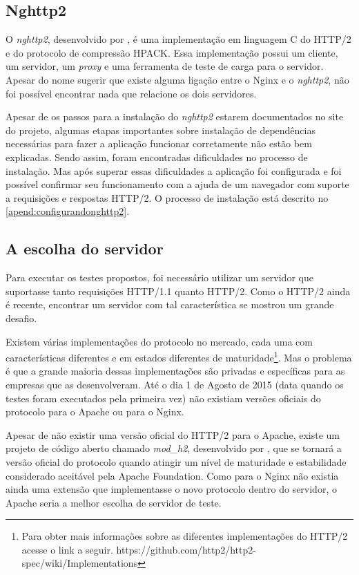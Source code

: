 \subsection{Nghttp2}
\label{nghttp2}

O \textit{nghttp2}, desenvolvido por , é uma implementação em linguagem C do HTTP/2 e do protocolo de compressão HPACK. Essa implementação possui um cliente, um servidor, um \textit{proxy} e uma ferramenta de teste de carga para o servidor. Apesar do nome sugerir que existe alguma ligação entre o Nginx e o \textit{nghttp2}, não foi possível encontrar nada que relacione os dois servidores.

Apesar de os passos para a instalação do \textit{nghttp2} estarem documentados no site do projeto, algumas etapas importantes sobre instalação de dependências necessárias para fazer a aplicação funcionar corretamente não estão bem explicadas. Sendo assim, foram encontradas dificuldades no processo de instalação. Mas após superar essas dificuldades a aplicação foi configurada e foi possível confirmar seu funcionamento com a ajuda de um navegador com suporte a requisições e respostas HTTP/2. O processo de instalação está descrito no \autoref{apend:configurandonghttp2}.

\subsection{A escolha do servidor}
\label{aescolhadoservidor}

Para executar os testes propostos, foi necessário utilizar um servidor que suportasse tanto requisições HTTP/1.1 quanto HTTP/2. Como o HTTP/2 ainda é recente, encontrar um servidor com tal característica se mostrou um grande desafio.

Existem várias implementações do protocolo no mercado, cada uma com características diferentes e em estados diferentes de maturidade\footnote{Para obter mais informações sobre as diferentes implementações do HTTP/2 acesse o link a seguir. https://github.com/http2/http2-spec/wiki/Implementations}. Mas o problema é que a grande maioria dessas implementações são privadas e específicas para as empresas que as desenvolveram. Até o dia 1 de Agosto de 2015 (data quando os testes foram executados pela primeira vez) não existiam versões oficiais do protocolo para o Apache ou para o Nginx.

Apesar de não existir uma versão oficial do HTTP/2 para o Apache, existe um projeto de código aberto chamado \textit{mod\_h2}, desenvolvido por , que se tornará a versão oficial do protocolo quando atingir um nível de maturidade e estabilidade considerado aceitável pela Apache Foundation. Como para o Nginx não existia ainda uma extensão que implementasse o novo protocolo dentro do servidor, o Apache seria a melhor escolha de servidor de teste.

